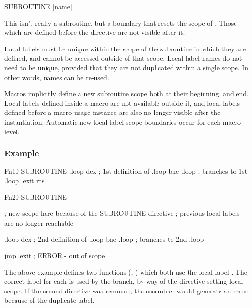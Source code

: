 \begin{usage}
  SUBROUTINE [name]
\end{usage}

This isn't really a subroutine, but a boundary that resets the scope of . Those which are defined before the  directive are not visible after it.

Local labels must be unique within the scope of the subroutine in which they are defined, and cannot be accessed outside of that scope. Local label names do not need to be unique, provided that they are not duplicated within a single scope. In other words, names can be re-used.

Macros implicitly define a new subroutine scope both at their beginning, and end. Local labels defined inside a macro are not available outside it, and local labels defined before a macro usage instance are also no longer visible after the instantiation. Automatic new local label scope boundaries occur for each macro level.


\subsubsection{Example}

\begin{code}
Fn10
            SUBROUTINE
.loop       dex           ; 1st definition of .loop
            bne .loop     ; branches to 1st .loop
.exit       rts

Fn20        SUBROUTINE

  ; new scope here because of the SUBROUTINE directive
  ; previous local labels are no longer reachable

.loop       dex           ; 2nd definition of .loop
            bne .loop     ; branches to 2nd .loop
            
            jmp .exit     ; ERROR - out of scope
            
\end{code}

The above example defines two functions (, ) which both use the local label . The correct label for each is used by the branch, by way of the  directive  setting local scope.  If the second  directive  was removed, the assembler would generate an error because of the duplicate label.

